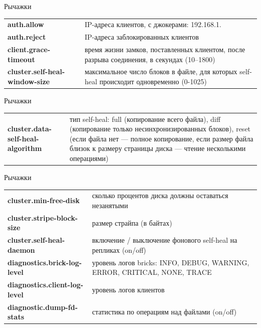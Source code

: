 \documentclass{beamer}
\begin{document}
\begin{frame}{Рычажки}
	\begin{block}{}
		\begin{tabular}{ p{6cm} p{5cm} }
			\textbf{auth.allow} & IP-адреса клиентов, с джокерами: 192.168.1.\* \\
			\textbf{auth.reject} &  IP-адреса заблокированных клиентов \\
			\textbf{client.grace-timeout} & время жизни замков, поставленных клиентом, после разрыва соединения, в секундах (10--1800) \\
			\textbf{cluster.self-heal-window-size} & максимальное число блоков в файле, для которых self-heal происходит одновременно (0-1025)\\
		\end{tabular}
	\end{block}
\end{frame}

\begin{frame}{Рычажки}
	\begin{block}{}
		\begin{tabular}{ p{6cm} p{5cm} }
			\textbf{cluster.data-self-heal-algorithm} & тип self-heal: full (копирование всего файла), diff (копирование только несинхронизированных блоков), reset (если файла нет --- полное копирование, если размер файла близок к размеру страницы диска --- чтение несколькими операциями) \\
		\end{tabular}
	\end{block}
\end{frame}


\begin{frame}{Рычажки}
	\begin{block}{}
		\begin{tabular}{ p{6cm} p{5cm} }
			\textbf{cluster.min-free-disk} & сколько процентов диска должны оставаться незанятыми \\ %
			\textbf{cluster.stripe-block-size} & размер страйпа (в байтах) \\
			\textbf{cluster.self-heal-daemon} & включение / выключение фонового self-heal на репликах (on/off) \\
			\textbf{diagnostics.brick-log-level} & уровень логов bricks: INFO, DEBUG, WARNING, ERROR, CRITICAL, NONE, TRACE \\
			\textbf{diagnostics.client-log-level} & уровень логов клиентов \\
			\textbf{diagnostic.dump-fd-stats} & статистика по операциям над файлами (on/off) \\
		\end{tabular}	
	\end{block}
\end{frame}
\end{document}
